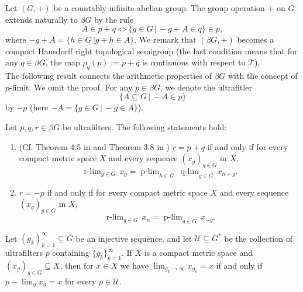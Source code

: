 \documentclass[graybox]{svmult}
\theoremstyle{definition}
\newcommand{\plimgG}[3]{\mathop {#1\text{-lim}}_{#2\in #3}\,}
\begin{document}
Let $(G,+)$ be a countably infinite abelian group. 
The group operation $+$ on $G$ extends naturally to $\beta G$ by the rule 
\begin{equation}\label{2.SumFormula}
A\in p+q\iff \{g\in G\,|\,-g+A\in q\}\in p,
\end{equation}
where $-g+A=\{h\in G\,|g+h\in A\}$. We remark that $(\beta G,+)$ becomes a compact Hausdorff right topological semigroup (the last condition means that for any $q\in \beta G$, the map $\rho_q(p):=p+q$ is continuous with respect to $\mathcal T$).\\
The following result connects the arithmetic properties of $\beta G$ with the concept of $p$-limit. We omit the proof.
For any $p\in\beta G$, we denote the ultrafitler 
$$
\{A\subseteq G\,|\,-A\in p\}
$$
by $-p$ (here $-A=\{g\in G\,|\,-g\in A\}$).
\begin{proposition}
    Let $p,q,r\in\beta G$ be ultrafilters. The following statements hold:
    \begin{enumerate}
        \item (Cf. Theorem 4.5 in \cite{HBook} and Theorem 3.8 in \cite{ERTAnUpdate}) $r=p+q$ if and only if for every compact metric space $X$ and every sequence $(x_g)_{g\in G}$ in $X$,
        $$
\plimgG{r}{g}{G}x_g=\plimgG{p}{h}{G}\plimgG{q}{g}{G}x_{h+g}.
        $$
        \item $r=-p$ if and only if  for every compact metric space $X$ and every sequence $(x_g)_{g\in G}$ in $X$,
        $$
\plimgG{r}{g}{G}x_n=\plimgG{p}{g}{G}x_{-g}.
        $$
    \end{enumerate}
\end{proposition}

\begin{remark}
    Let $(g_k)_{k = 1}^\infty \subseteq G$ be an injective sequence, and let $\mathcal{U} \subseteq G^*$ be the collection of ultrafilters $p$ containing $\{g_k\}_{k = 1}^\infty$.
    If $X$ is a compact metric space and $(x_g)_{g \in G} \subseteq X$, then for $x \in X$ we have $\displaystyle\lim_{g_k\rightarrow\infty}x_{g_k} = x$ if and only if $p-\lim_gx_g = x$ for every $p \in \mathcal{U}$.
\end{remark}
\end{document}
